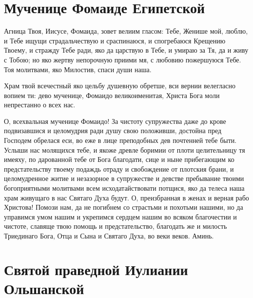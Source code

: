 \section{Мученице Фомаиде Египетской}
 



 Агница Твоя, Иисусе, Фомаида, зовет велиим гласом: Тебе, Женише мой, люблю, и Тебе ищущи страдальчествую и сраспинаюся, и спогребаюся Крещению Твоему, и стражду Тебе ради, яко да царствую в Тебе, и умираю за Тя, да и живу с Тобою; но яко жертву непорочную приими мя, с любовию пожершуюся Тебе. Тоя молитвами, яко Милостив, спаси души наша.



 Храм твой всечестный яко цельбу душевную обретше, вси вернии велегласно вопием ти: дево мученице, Фомаидо великоименитая, Христа Бога моли непрестанно о всех нас.



 О, всехвальная мученице Фомаидо! За чистоту супружества даже до крове подвизавшися и целомудрия ради душу свою положивши, достойна пред Господем обрелася еси, во еже в лице преподобных дев почтенней тебе быти. Услыши нас молящихся тебе, и якоже древле боримии от плоти целительницу тя имеяху, по дарованной тебе от Бога благодати, сице и ныне прибегающим ко предстательству твоему подаждь отраду и свобождение от плотския брани, и целомудренное житие и незазорное в супружестве и девстве пребывание твоими богоприятными молитвами всем исходатайствовати потщися, яко да телеса наша храм живущаго в нас Святаго Духа будут. О, преизбранная в женах и верная рабо Христова! Помози нам, да не погибнем со страстьми и похотьми нашими, но да управимся умом нашим и укрепимся сердцем нашим во всяком благочестии и чистоте, славяще твою помощь и предстательство, благодать же и милость Триединаго Бога, Отца и Сына и Святаго Духа, во веки веков. Аминь. 
\mychapterending


 

\section{Святой праведной Иулиании Ольшанской}
 


